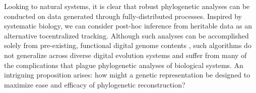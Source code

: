 
Looking to natural systems, it is clear that robust phylogenetic analyses can be conducted on data generated through fully-distributed processes.
Inspired by systematic biology, we can consider post-hoc inference from heritable data as an alternative tocentralized tracking.
Although such analyses can be accomplished solely from pre-existing, functional digital genome contents \citep{moreno2021case}, such algorithms do not generalize across diverse digital evolution systems and suffer from many of the complications that plague phylogenetic analyses of biological systems.
An intriguing proposition arises: how might a genetic representation be designed to maximize ease and efficacy of phylogenetic reconstruction?

